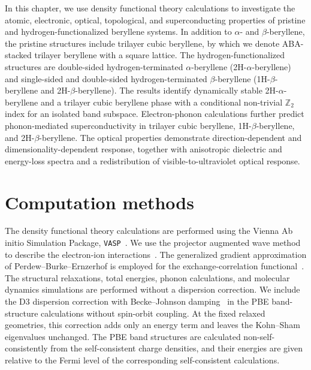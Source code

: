 In this chapter,
we use density functional theory calculations to investigate the atomic,
electronic,
optical,
topological,
and superconducting properties of pristine and hydrogen-functionalized beryllene systems.
In addition to $\alpha$- and $\beta$-beryllene,
the pristine structures include trilayer cubic beryllene,
by which we denote ABA-stacked trilayer beryllene with a square lattice.
The hydrogen-functionalized structures are double-sided hydrogen-terminated $\alpha$-beryllene (2H-$\alpha$-beryllene)
and single-sided and double-sided hydrogen-terminated $\beta$-beryllene (1H-$\beta$-beryllene and 2H-$\beta$-beryllene).
The results identify dynamically stable 2H-$\alpha$-beryllene and a trilayer cubic beryllene phase with a conditional non-trivial $\mathbb{Z}_2$ index for an isolated band subspace.
Electron-phonon calculations further predict phonon-mediated superconductivity in trilayer cubic beryllene, 1H-$\beta$-beryllene, and 2H-$\beta$-beryllene.
The optical properties demonstrate direction-dependent and dimensionality-dependent response,
together with anisotropic dielectric and energy-loss spectra and a redistribution of visible-to-ultraviolet optical response.

\section{Computation methods}
\label{3_methods}

The density functional theory calculations are performed using the Vienna Ab initio Simulation Package,
\texttt{VASP}~\cite{kresse1993ab,kresse1994ab,kresse1996efficiency,kresse1996efficient}.
We use the projector augmented wave method to describe the electron-ion interactions~\cite{kresse1999ultrasoft}.
The generalized gradient approximation of Perdew--Burke--Ernzerhof is employed for the exchange-correlation functional~\cite{perdew1996generalized}.
The structural relaxations,
total energies,
phonon calculations,
and molecular dynamics simulations are performed without a dispersion correction.
We include the D3 dispersion correction with Becke--Johnson damping~\cite{becke2005density,grimme2010consistent,grimme2011effect} in the PBE band-structure calculations without spin-orbit coupling.
At the fixed relaxed geometries,
this correction adds only an energy term and leaves the Kohn--Sham eigenvalues unchanged.
The PBE band structures are calculated non-self-consistently from the self-consistent charge densities,
and their energies are given relative to the Fermi level of the corresponding self-consistent calculations.

